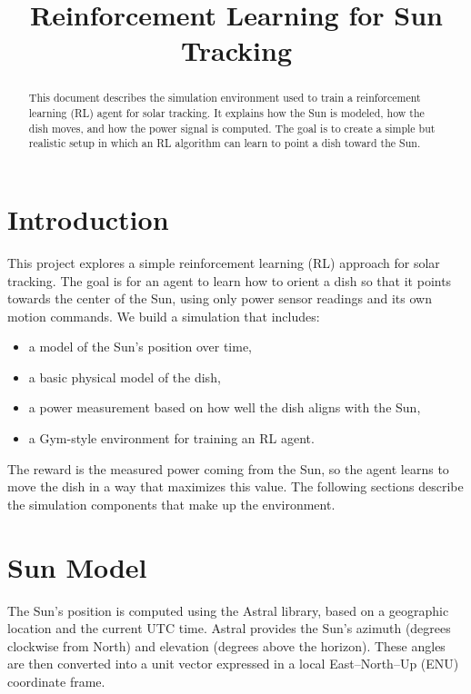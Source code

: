 \documentclass[11pt,a4paper]{article}
\title{Reinforcement Learning for Sun Tracking}
\author{}
\date{}
\begin{document}
\maketitle

\begin{abstract}
This document describes the simulation environment used to train a reinforcement learning (RL) agent for solar tracking. 
It explains how the Sun is modeled, how the dish moves, and how the power signal is computed. 
The goal is to create a simple but realistic setup in which an RL algorithm can learn to point a dish toward the Sun.
\end{abstract}

\section{Introduction}

This project explores a simple reinforcement learning (RL) approach for solar tracking.  
The goal is for an agent to learn how to orient a dish so that it points towards the center of the Sun, using only power sensor readings and its own motion commands.  
We build a simulation that includes:
\begin{itemize}
    \item a model of the Sun's position over time,
    \item a basic physical model of the dish,
    \item a power measurement based on how well the dish aligns with the Sun,
    \item a Gym-style environment for training an RL agent.
\end{itemize}

The reward is the measured power coming from the Sun, so the agent learns to move the dish in a way that maximizes this value.  
The following sections describe the simulation components that make up the environment.


\section{Sun Model}

The Sun's position is computed using the Astral library, based on a geographic location and the current UTC time.  
Astral provides the Sun's azimuth (degrees clockwise from North) and elevation (degrees above the horizon).  
These angles are then converted into a unit vector expressed in a local East--North--Up (ENU) coordinate frame.
\end{document}

